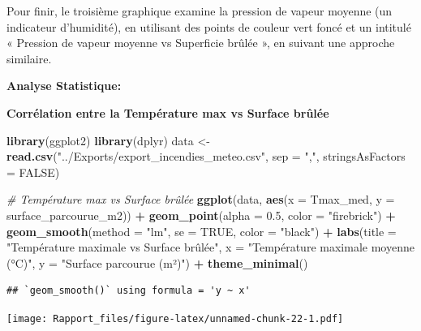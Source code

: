 \documentclass[
]{article}
\newenvironment{Shaded}{\begin{snugshade}}{\end{snugshade}}
\newcommand{\AttributeTok}[1]{\textcolor[rgb]{0.13,0.29,0.53}{#1}}
\newcommand{\CommentTok}[1]{\textcolor[rgb]{0.56,0.35,0.01}{\textit{#1}}}
\newcommand{\ConstantTok}[1]{\textcolor[rgb]{0.56,0.35,0.01}{#1}}
\newcommand{\FloatTok}[1]{\textcolor[rgb]{0.00,0.00,0.81}{#1}}
\newcommand{\FunctionTok}[1]{\textcolor[rgb]{0.13,0.29,0.53}{\textbf{#1}}}
\newcommand{\NormalTok}[1]{#1}
\newcommand{\OtherTok}[1]{\textcolor[rgb]{0.56,0.35,0.01}{#1}}
\newcommand{\SpecialCharTok}[1]{\textcolor[rgb]{0.81,0.36,0.00}{\textbf{#1}}}
\newcommand{\StringTok}[1]{\textcolor[rgb]{0.31,0.60,0.02}{#1}}
\begin{document}
Pour finir, le troisième graphique examine la pression de vapeur moyenne
(un indicateur d'humidité), en utilisant des points de couleur vert
foncé et un intitulé « Pression de vapeur moyenne vs Superficie brûlée
», en suivant une approche similaire.

\textbf{Analyse Statistique:}

\textbf{Corrélation entre la Température max vs Surface brûlée}

\begin{Shaded}
\begin{Highlighting}[]
\FunctionTok{library}\NormalTok{(ggplot2)}
\FunctionTok{library}\NormalTok{(dplyr)}
\NormalTok{data }\OtherTok{\textless{}{-}} \FunctionTok{read.csv}\NormalTok{(}\StringTok{"../Exports/export\_incendies\_meteo.csv"}\NormalTok{, }\AttributeTok{sep =} \StringTok{","}\NormalTok{, }\AttributeTok{stringsAsFactors =} \ConstantTok{FALSE}\NormalTok{)}

\CommentTok{\# Température max vs Surface brûlée}
\FunctionTok{ggplot}\NormalTok{(data, }\FunctionTok{aes}\NormalTok{(}\AttributeTok{x =}\NormalTok{ Tmax\_med, }\AttributeTok{y =}\NormalTok{ surface\_parcourue\_m2)) }\SpecialCharTok{+}
  \FunctionTok{geom\_point}\NormalTok{(}\AttributeTok{alpha =} \FloatTok{0.5}\NormalTok{, }\AttributeTok{color =} \StringTok{"firebrick"}\NormalTok{) }\SpecialCharTok{+}
  \FunctionTok{geom\_smooth}\NormalTok{(}\AttributeTok{method =} \StringTok{"lm"}\NormalTok{, }\AttributeTok{se =} \ConstantTok{TRUE}\NormalTok{, }\AttributeTok{color =} \StringTok{"black"}\NormalTok{) }\SpecialCharTok{+}
  \FunctionTok{labs}\NormalTok{(}\AttributeTok{title =} \StringTok{"Température maximale vs Surface brûlée"}\NormalTok{,}
       \AttributeTok{x =} \StringTok{"Température maximale moyenne (°C)"}\NormalTok{,}
       \AttributeTok{y =} \StringTok{"Surface parcourue (m²)"}\NormalTok{) }\SpecialCharTok{+}
  \FunctionTok{theme\_minimal}\NormalTok{()}
\end{Highlighting}
\end{Shaded}

\begin{verbatim}
## `geom_smooth()` using formula = 'y ~ x'
\end{verbatim}

\texttt{[image: Rapport\_files/figure-latex/unnamed-chunk-22-1.pdf]}

\begin{Shaded}
\end{Shaded}
\end{document}

